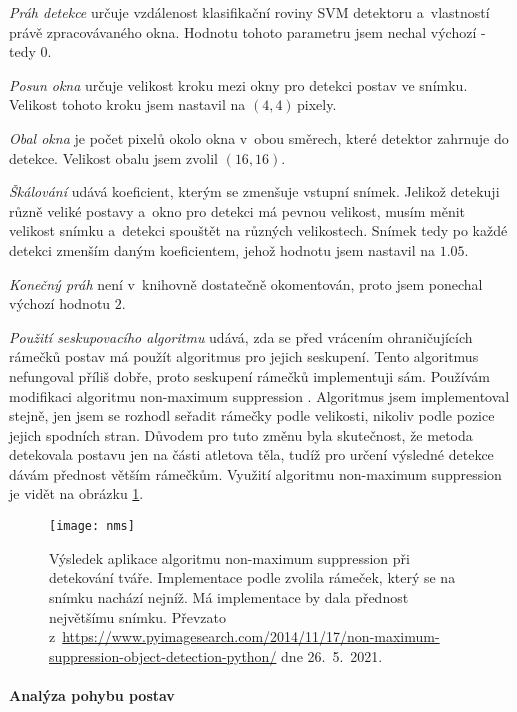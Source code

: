 \emph{Práh detekce} určuje vzdálenost klasifikační roviny SVM detektoru a~vlastností právě zpracovávaného okna. Hodnotu tohoto parametru jsem nechal výchozí - tedy $0$.

\emph{Posun okna} určuje velikost kroku mezi okny pro detekci postav ve snímku. Velikost tohoto kroku jsem nastavil na $(4,4)$\,\rm pixely.

\emph{Obal okna} je počet pixelů okolo okna v~obou směrech, které detektor zahrnuje do detekce. Velikost obalu jsem zvolil $(16,16)$.

\emph{Škálování} udává koeficient, kterým se zmenšuje vstupní snímek. Jelikož detekuji různě veliké postavy a~okno pro detekci má pevnou velikost, musím měnit velikost snímku a~detekci spouštět na různých velikostech. Snímek tedy po každé detekci zmenším daným koeficientem, jehož hodnotu jsem nastavil na $1.05$.

\emph{Konečný práh} není v~knihovně dostatečně okomentován, proto jsem ponechal výchozí hodnotu $2$.

\emph{Použití seskupovacího algoritmu} udává, zda se před vrácením ohraničujících rámečků postav má použít algoritmus pro jejich seskupení. Tento algoritmus nefungoval příliš dobře, proto seskupení rámečků implementuji sám. Používám modifikaci algoritmu non-maximum suppression \citep{NMS}. Algoritmus jsem implementoval stejně, jen jsem se rozhodl seřadit rámečky podle velikosti, nikoliv podle pozice jejich spodních stran. Důvodem pro tuto změnu byla skutečnost, že metoda detekovala postavu jen na části atletova těla, tudíž pro určení výsledné detekce dávám přednost větším rámečkům. Využití algoritmu non-maximum suppression je vidět na obrázku \ref{fig:nms}.

\begin{figure}[h]\centering
    \texttt{[image: nms]}
    \caption{
        \centering\small
        Výsledek aplikace algoritmu non-maximum suppression při detekování tváře. Implementace podle \citet{NMS} zvolila rámeček, který se na snímku nachází nejníž. Má implementace by dala přednost největšímu snímku. Převzato z~\url{https://www.pyimagesearch.com/2014/11/17/non-maximum-suppression-object-detection-python/} dne 26.~5.~2021.
    }
    \label{fig:nms}
\end{figure}

\paragraph{Analýza pohybu postav}

